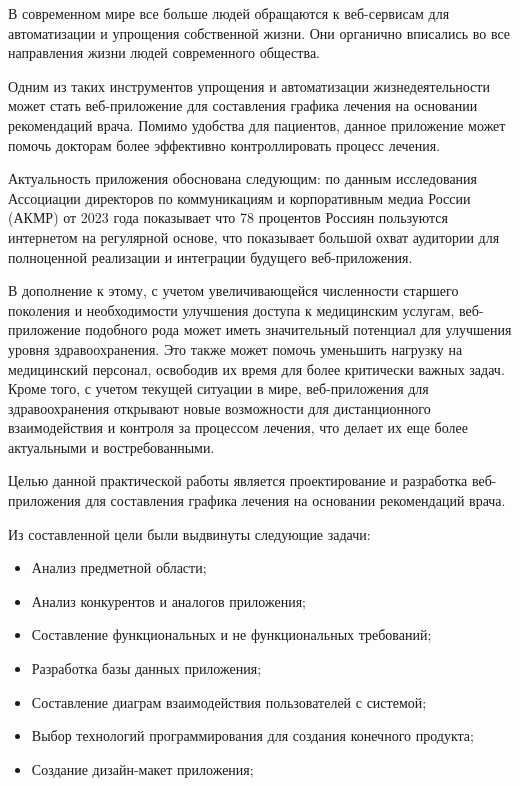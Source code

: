 \intro 
    В современном мире все больше людей обращаются к веб-сервисам для %
    автоматизации и упрощения собственной жизни. Они органично вписались %
    во все направления жизни людей современного общества.  

    Одним из таких инструментов упрощения и автоматизации жизнедеятельности может %
    стать веб-приложение для составления графика лечения на основании рекомендаций %
    врача. Помимо удобства для пациентов, данное приложение может помочь докторам %
    более эффективно контроллировать процесс лечения.

    Актуальность приложения обоснована следующим: по данным исследования Ассоциации директоров по коммуникациям и %
    корпоративным медиа России (АКМР)\cite{internet_users} от 2023 года показывает что 78 процентов %
    Россиян пользуются интернетом на регулярной основе, что показывает большой %
    охват аудитории для полноценной реализации и интеграции будущего веб-приложения.

    В дополнение к этому, с учетом увеличивающейся численности старшего поколения %
    и необходимости улучшения доступа к медицинским услугам, веб-приложение %
    подобного рода может иметь значительный потенциал для улучшения уровня %
    здравоохранения. Это также может помочь уменьшить нагрузку на медицинский %
    персонал, освободив их время для более критически важных задач. Кроме того, %
    с учетом текущей ситуации в мире, веб-приложения для здравоохранения открывают %
    новые возможности для дистанционного взаимодействия и контроля за процессом %
    лечения, что делает их еще более актуальными и востребованными.

    Целью данной практической работы является проектирование и разработка веб-приложения для составления графика лечения на %
    основании рекомендаций врача.

    Из составленной цели были выдвинуты следующие задачи:
        \begin{itemize}
            \item Анализ предметной области;
            \item Анализ конкурентов и аналогов приложения;
            \item Составление функциональных и не функциональных требований;
            \item Разработка базы данных приложения;
            \item Составление диаграм взаимодействия пользователей с системой;
            \item Выбор технологий программирования для создания конечного продукта;
            \item Создание дизайн-макет приложения; 
        \end{itemize}